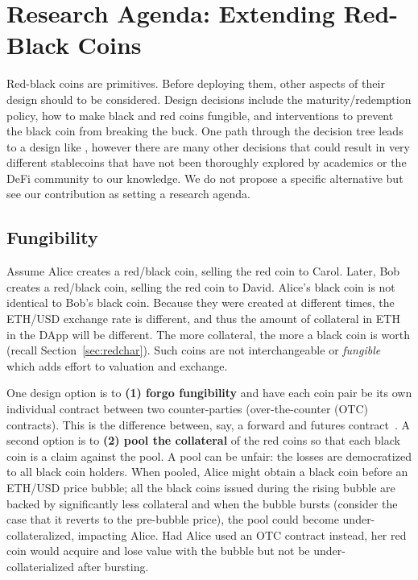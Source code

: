 

\section{Research Agenda: Extending Red-Black Coins}
\label{sec:taxonomy}

Red-black coins are primitives. Before deploying them, other aspects of their design should to be considered. Design decisions include the maturity/redemption policy, how to make black and red coins fungible, and interventions to prevent the black coin from breaking the buck. One path through the decision tree leads to a design like \dai, however there are many other decisions that could result in very different stablecoins that have not been thoroughly explored by academics or the DeFi community to our knowledge. We do not propose a specific alternative but see our contribution as setting a research agenda. 



\subsection{Fungibility}

Assume Alice creates a red/black coin, selling the red coin to Carol. Later, Bob creates a red/black coin, selling the red coin to David. Alice's black coin is not identical to Bob's black coin. Because they were created at different times, the ETH/USD exchange rate is different, and thus the  amount of collateral in ETH in the DApp will be different. The more collateral, the more a black coin is worth (recall Section~\ref{sec:redchar}). Such coins are not interchangeable or \textit{fungible} which adds effort to valuation and exchange. 

One design option is to \textbf{(1) forgo fungibility} and have each coin pair be its own individual contract between two counter-parties (\aka over-the-counter (OTC) contracts). This is the difference between, say, a forward and futures contract~\cite{Har03}. A second option is to \textbf{(2) pool the collateral} of the red coins so that each black coin is a claim against the pool. A pool can be unfair: the losses are democratized to all black coin holders. When pooled, Alice might obtain a black coin before an ETH/USD price bubble; all the black coins issued during the rising bubble are backed by significantly less collateral and when the bubble bursts (consider the case that it reverts to the pre-bubble price), the pool could become under-collateralized, impacting Alice. Had Alice used an OTC contract instead, her red coin would acquire and lose value with the bubble but not be under-collaterialized after bursting. 

